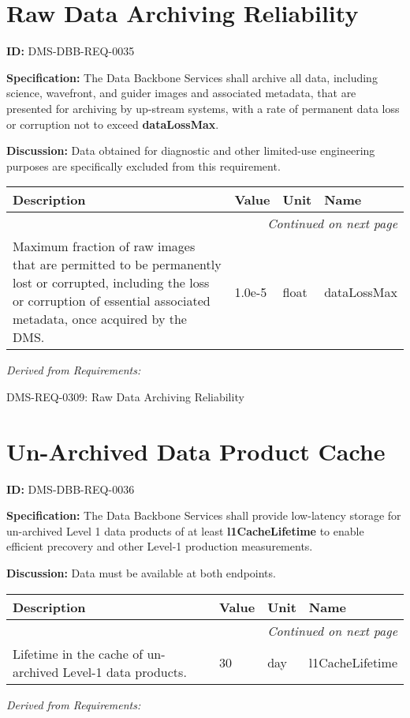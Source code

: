 \documentclass[SE,toc,lsstdraft]{lsstdoc}
\makeatletter
\newcommand{\paramname}[1]{\hspace{0pt}#1}
\newcommand{\unitname}[1]{\hspace{0pt}#1}
\newenvironment{parameters}[0]{%
\setlength\LTleft{0pt}
\setlength\LTright{\fill}
\begin{small}
\begin{longtable}[]{|p{0.49\textwidth}|l|p{0.6in}|p{1.70in}@{}|}

\hline \textbf{Description} & \textbf{Value} & \textbf{Unit} & \textbf{Name} \\ \hline
\endhead

\hline \multicolumn{4}{r}{\emph{Continued on next page}} \\
\endfoot

\hline\hline
\endlastfoot
}{%
\hline
\end{longtable}
\end{small}
}
\makeatother
\begin{document}
\section{Raw Data Archiving Reliability}

\label{DMS-DBB-REQ-0035}
\textbf{ID:} DMS-DBB-REQ-0035

\textbf{Specification:}
The Data Backbone Services shall archive all data, including science, wavefront, and guider images and associated metadata, that are presented for archiving by up-stream systems, with a rate of permanent data loss or corruption not to exceed \textbf{dataLossMax}.

\textbf{Discussion:}
Data obtained for diagnostic and other limited-use engineering purposes are specifically excluded from this requirement.

\begin{parameters}
Maximum fraction of raw images that are permitted to be permanently lost or corrupted, including the loss or corruption of essential associated metadata, once acquired by the DMS.
&
1.0e-5
&
\unitname{%
float
}
&
\paramname{%
dataLossMax
} \\\hline
\end{parameters}

\emph{Derived from Requirements:}

DMS-REQ-0309:
Raw Data Archiving Reliability \newline

\section{Un-Archived Data Product Cache}

\label{DMS-DBB-REQ-0036}
\textbf{ID:} DMS-DBB-REQ-0036

\textbf{Specification:}
The Data Backbone Services shall provide low-latency storage for un-archived Level 1 data products of at least \textbf{l1CacheLifetime} to enable efficient precovery and other Level-1 production measurements.

\textbf{Discussion:}
Data must be available at both endpoints.

\begin{parameters}
Lifetime in the cache of un-archived Level-1 data products.
&
30
&
\unitname{%
day
}
&
\paramname{%
l1CacheLifetime
} \\\hline
\end{parameters}

\emph{Derived from Requirements:}
\end{document}
